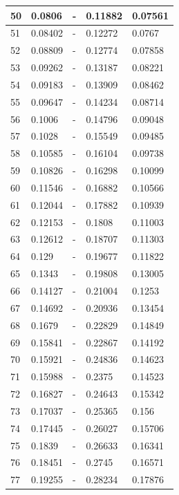 \begin{table}[!ht]
\begin{tabular}{|l|l|l|l|l|}
        50 & 0.0806 & - & 0.11882 & 0.07561 \\ \hline
        51 & 0.08402 & - & 0.12272 & 0.0767 \\ \hline
        52 & 0.08809 & - & 0.12774 & 0.07858 \\ \hline
        53 & 0.09262 & - & 0.13187 & 0.08221 \\ \hline
        54 & 0.09183 & - & 0.13909 & 0.08462 \\ \hline
        55 & 0.09647 & - & 0.14234 & 0.08714 \\ \hline
        56 & 0.1006 & - & 0.14796 & 0.09048 \\ \hline
        57 & 0.1028 & - & 0.15549 & 0.09485 \\ \hline
        58 & 0.10585 & - & 0.16104 & 0.09738 \\ \hline
        59 & 0.10826 & - & 0.16298 & 0.10099 \\ \hline
        60 & 0.11546 & - & 0.16882 & 0.10566 \\ \hline
        61 & 0.12044 & - & 0.17882 & 0.10939 \\ \hline
        62 & 0.12153 & - & 0.1808 & 0.11003 \\ \hline
        63 & 0.12612 & - & 0.18707 & 0.11303 \\ \hline
        64 & 0.129 & - & 0.19677 & 0.11822 \\ \hline
        65 & 0.1343 & - & 0.19808 & 0.13005 \\ \hline
        66 & 0.14127 & - & 0.21004 & 0.1253 \\ \hline
        67 & 0.14692 & - & 0.20936 & 0.13454 \\ \hline
        68 & 0.1679 & - & 0.22829 & 0.14849 \\ \hline
        69 & 0.15841 & - & 0.22867 & 0.14192 \\ \hline
        70 & 0.15921 & - & 0.24836 & 0.14623 \\ \hline
        71 & 0.15988 & - & 0.2375 & 0.14523 \\ \hline
        72 & 0.16827 & - & 0.24643 & 0.15342 \\ \hline
        73 & 0.17037 & - & 0.25365 & 0.156 \\ \hline
        74 & 0.17445 & - & 0.26027 & 0.15706 \\ \hline
        75 & 0.1839 & - & 0.26633 & 0.16341 \\ \hline
        76 & 0.18451 & - & 0.2745 & 0.16571 \\ \hline
        77 & 0.19255 & - & 0.28234 & 0.17876 \\ \hline

\end{tabular}
\end{table}
